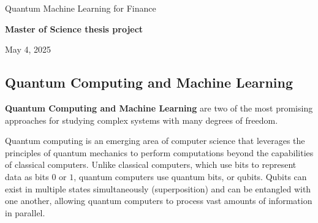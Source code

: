 \documentclass[%
oneside,                 %
final,                   %
10pt]{article}
\begin{document}

\newcommand{\exercisesection}[1]{\subsection*{#1}}






\thispagestyle{empty}

\begin{center}
{\LARGE\bf
\begin{spacing}{1.25}
Quantum Machine Learning for Finance
\end{spacing}
}
\end{center}


\begin{center}
{\bf Master of Science thesis project${}^{}$} \\ [0mm]
\end{center}

\begin{center}
\end{center}
    

\begin{center}
May 4, 2025
\end{center}

\vspace{1cm}


\subsection{Quantum Computing and Machine Learning}

\textbf{Quantum Computing and Machine Learning} are two of the most promising
approaches for studying complex systems with many degrees of freedom.

Quantum computing is an emerging area of computer science that
leverages the principles of quantum mechanics to perform computations
beyond the capabilities of classical computers. Unlike classical
computers, which use bits to represent data as bits $0$ or $1$, quantum
computers use quantum bits, or qubits. Qubits can exist in multiple
states simultaneously (superposition) and can be entangled with one
another, allowing quantum computers to process vast amounts of
information in parallel.
\end{document}
